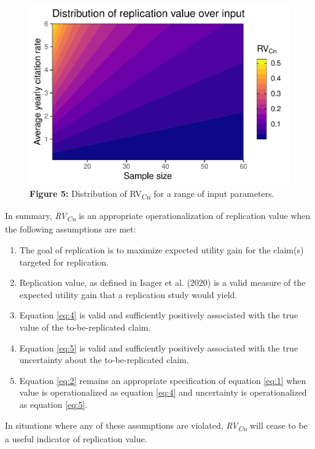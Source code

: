 \documentclass[
  english,
  jou,floatsintext]{apa6}
\providecommand{\tightlist}{%
  \setlength{\itemsep}{0pt}\setlength{\parskip}{0pt}}
\begin{document}
\begin{figure}
\centering
\includegraphics{RVcn_manuscript_files/figure-latex/5-1.pdf}
\caption{\label{fig:5}\textbf{Figure 5:} Distribution of RV\textsubscript{Cn} for a range of input parameters.}
\end{figure}

In summary, \emph{RV\textsubscript{Cn}} is an appropriate operationalization of replication value when the following assumptions are met:

\begin{enumerate}
\def\labelenumi{\arabic{enumi}.}
\tightlist
\item
  The goal of replication is to maximize expected utility gain for the claim(s) targeted for replication.
\item
  Replication value, as defined in Isager et al. (2020) is a valid measure of the expected utility gain that a replication study would yield.
\item
  Equation \eqref{eq:4} is valid and sufficiently positively associated with the true value of the to-be-replicated claim.
\item
  Equation \eqref{eq:5} is valid and sufficiently positively associated with the true uncertainty about the to-be-replicated claim.
\item
  Equation \eqref{eq:2} remains an appropriate specification of equation \eqref{eq:1} when value is operationalized as equation \eqref{eq:4} and uncertainty is operationalized as equation \eqref{eq:5}.
\end{enumerate}

In situations where any of these assumptions are violated, \emph{RV\textsubscript{Cn}} will cease to be a useful indicator of replication value.
\end{document}
